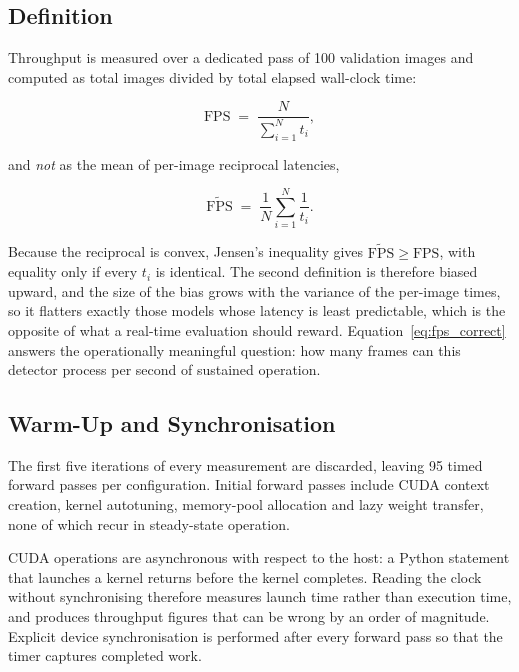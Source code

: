 \documentclass[MScCS]{uccthesis}
\begin{document}
\subsection{Definition}

Throughput is measured over a dedicated pass of 100 validation images and
computed as total images divided by total elapsed wall-clock time:

\begin{equation}
   \mathrm{FPS} \;=\; \frac{N}{\sum_{i=1}^{N} t_i} ,
   \label{eq:fps_correct}
\end{equation}

and \emph{not} as the mean of per-image reciprocal latencies,

\begin{equation}
   \widetilde{\mathrm{FPS}} \;=\; \frac{1}{N}\sum_{i=1}^{N} \frac{1}{t_i} .
   \label{eq:fps_wrong}
\end{equation}

Because the reciprocal is convex, Jensen's inequality gives
$\widetilde{\mathrm{FPS}} \geq \mathrm{FPS}$, with equality only if every $t_i$
is identical. The second definition is therefore biased upward, and the size of
the bias grows with the variance of the per-image times, so it flatters
exactly those models whose latency is least predictable, which is the opposite
of what a real-time evaluation should reward. Equation~\eqref{eq:fps_correct}
answers the operationally meaningful question: how many frames can this
detector process per second of sustained operation.

\subsection{Warm-Up and Synchronisation}

The first five iterations of every measurement are discarded, leaving 95 timed
forward passes per configuration. Initial forward
passes include CUDA context creation, kernel autotuning, memory-pool
allocation and lazy weight transfer, none of which recur in steady-state
operation.

CUDA operations are asynchronous with respect to the host: a Python statement
that launches a kernel returns before the kernel completes. Reading the clock
without synchronising therefore measures launch time rather than execution
time, and produces throughput figures that can be wrong by an order of
magnitude. Explicit device synchronisation is performed after every forward
pass so that the timer captures completed work.
\end{document}
